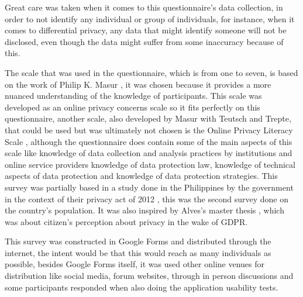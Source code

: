 Great care was taken when it comes to this questionnaire's data collection, in
order to not identify any individual or group of individuals, for
instance, when it comes to differential privacy, any data that might
identify someone will not be disclosed, even though the data might suffer
from some inaccuracy because of this.

The scale that was used in the questionnaire, which is from one to seven,
is based on the work of Philip K. Masur \cite{masur2018situational}, it
was chosen because it provides a more nuanced understanding
of the knowledge of participants. This scale was developed as an
online privacy concerns scale so it fits perfectly on this questionnaire,
another scale, also developed by Masur with Teutsch and Trepte,
that could be used but was ultimately not chosen is the Online Privacy
Literacy Scale \cite{masur2017entwicklung}, although the questionnaire does
contain some of the main aspects of this scale like knowledge of data collection and
analysis practices by institutions and online service providers
knowledge of data protection law, knowledge of technical aspects of data
protection and knowledge of data protection strategies.
This survey was partially based in a study done in the Philippines by the
government in the context of their privacy act of 2012 \cite{Philippine2022Conduct},
this was the second survey done on the country's population. It was also
inspired by Alves's master thesis \cite{alves2021}, which was about citizen's
perception about privacy in the wake of GDPR.

This survey was constructed in Google Forms and distributed through the internet,
the intent would be that this would reach as many individuals as possible,
besides Google Forms itself, it was used other online venues for distribution
like social media, forum websites, through in person discussions and
some participants responded when also doing the application usability tests.

